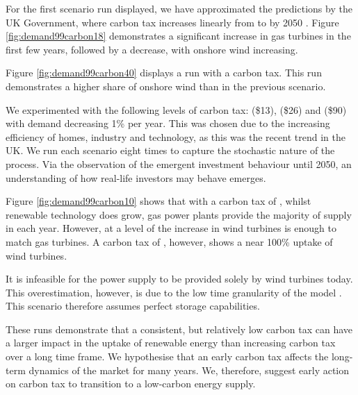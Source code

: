
For the first scenario run displayed, we have approximated the predictions by the UK Government, where carbon tax increases linearly from  to  by 2050 \cite{Department2016}. Figure \ref{fig:demand99carbon18} demonstrates a significant increase in gas turbines in the first few years, followed by a decrease, with onshore wind increasing.

Figure \ref{fig:demand99carbon40} displays a run with a  carbon tax. This run demonstrates a higher share of onshore wind than in the previous scenario. 

We experimented with the following levels of carbon tax:  (\$13),  (\$26) and  (\$90) with demand decreasing 1\% per year. This was chosen due to the increasing efficiency of homes, industry and technology, as this was the recent trend in the UK. We run each scenario eight times to capture the stochastic nature of the process. Via the observation of the emergent investment behaviour until 2050, an understanding of how real-life investors may behave emerges.


Figure \ref{fig:demand99carbon10} shows that with a carbon tax of , whilst renewable technology does grow, gas power plants provide the majority of supply in each year. However, at a level of  the increase in wind turbines is enough to match gas turbines. A carbon tax of , however, shows a near 100\% uptake of wind turbines.

It is infeasible for the power supply to be provided solely by wind turbines today. This overestimation, however, is due to the low time granularity of the model \cite{Collins2017}. This scenario therefore assumes perfect storage capabilities.



These runs demonstrate that a consistent, but relatively low carbon tax can have a larger impact in the uptake of renewable energy than increasing carbon tax over a long time frame. We hypothesise that an early carbon tax affects the long-term dynamics of the market for many years. We, therefore, suggest early action on carbon tax to transition to a low-carbon energy supply.


